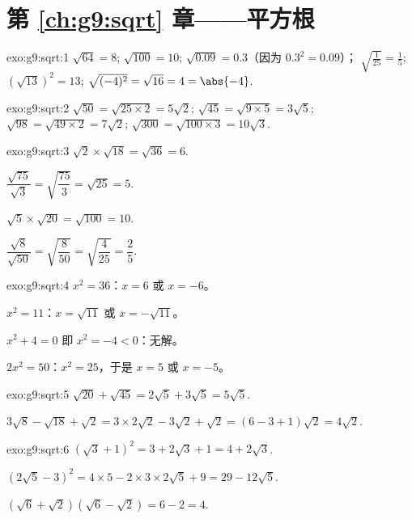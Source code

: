\section*{第 \ref{ch:g9:sqrt} 章——平方根}

\begin{solution}{exo:g9:sqrt:1}
$\sqrt{64} = 8$; \quad $\sqrt{100} = 10$; \quad
$\sqrt{0.09} = 0.3$（因为 $0.3^2 = 0.09$）； \quad
$\sqrt{\frac{1}{25}} = \frac15$; \quad
$\left(\sqrt{13}\right)^2 = 13$; \quad
$\sqrt{(-4)^2} = \sqrt{16} = 4 = \abs{-4}$.
\end{solution}

\begin{solution}{exo:g9:sqrt:2}
$\sqrt{50} = \sqrt{25 \times 2} = 5\sqrt2$; \quad
$\sqrt{45} = \sqrt{9 \times 5} = 3\sqrt5$; \quad
$\sqrt{98} = \sqrt{49 \times 2} = 7\sqrt2$; \quad
$\sqrt{300} = \sqrt{100 \times 3} = 10\sqrt3$.
\end{solution}

\begin{solution}{exo:g9:sqrt:3}
$\sqrt2 \times \sqrt{18} = \sqrt{36} = 6$.

$\dfrac{\sqrt{75}}{\sqrt3} = \sqrt{\dfrac{75}{3}} = \sqrt{25} = 5$.

$\sqrt5 \times \sqrt{20} = \sqrt{100} = 10$.

$\dfrac{\sqrt8}{\sqrt{50}} = \sqrt{\dfrac{8}{50}} = \sqrt{\dfrac{4}{25}}
= \dfrac25$.
\end{solution}

\begin{solution}{exo:g9:sqrt:4}
$x^2 = 36$：$x = 6$ 或 $x = -6$。

$x^2 = 11$：$x = \sqrt{11}$ 或 $x = -\sqrt{11}$。

$x^2 + 4 = 0$ 即 $x^2 = -4 < 0$：无解。

$2x^2 = 50$：$x^2 = 25$，于是 $x = 5$ 或 $x = -5$。
\end{solution}

\begin{solution}{exo:g9:sqrt:5}
$\sqrt{20} + \sqrt{45} = 2\sqrt5 + 3\sqrt5 = 5\sqrt5$.

$3\sqrt8 - \sqrt{18} + \sqrt2 = 3 \times 2\sqrt2 - 3\sqrt2 + \sqrt2
= (6 - 3 + 1)\sqrt2 = 4\sqrt2$.
\end{solution}

\begin{solution}{exo:g9:sqrt:6}
$\left(\sqrt3 + 1\right)^2 = 3 + 2\sqrt3 + 1 = 4 + 2\sqrt3$.

$\left(2\sqrt5 - 3\right)^2 = 4 \times 5 - 2 \times 3 \times 2\sqrt5 + 9
= 29 - 12\sqrt5$.

$\left(\sqrt6 + \sqrt2\right)\left(\sqrt6 - \sqrt2\right) = 6 - 2 = 4$.
\end{solution}


